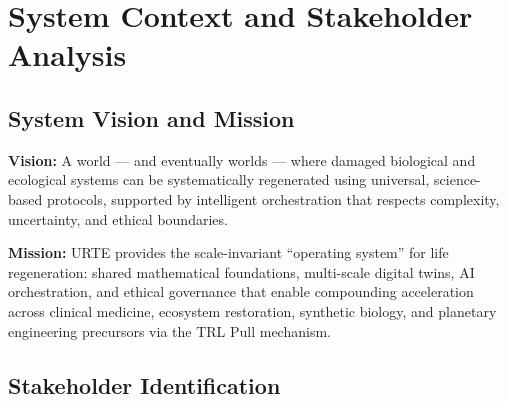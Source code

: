 \documentclass[11pt,a4paper]{report}
\begin{document}
\chapter{System Context and Stakeholder Analysis}

\section{System Vision and Mission}

\textbf{Vision:} A world --- and eventually worlds --- where damaged biological and ecological systems can be systematically regenerated using universal, science-based protocols, supported by intelligent orchestration that respects complexity, uncertainty, and ethical boundaries.

\textbf{Mission:} URTE provides the scale-invariant ``operating system'' for life regeneration: shared mathematical foundations, multi-scale digital twins, AI orchestration, and ethical governance that enable compounding acceleration across clinical medicine, ecosystem restoration, synthetic biology, and planetary engineering precursors via the TRL Pull mechanism.

\section{Stakeholder Identification}
\end{document}
